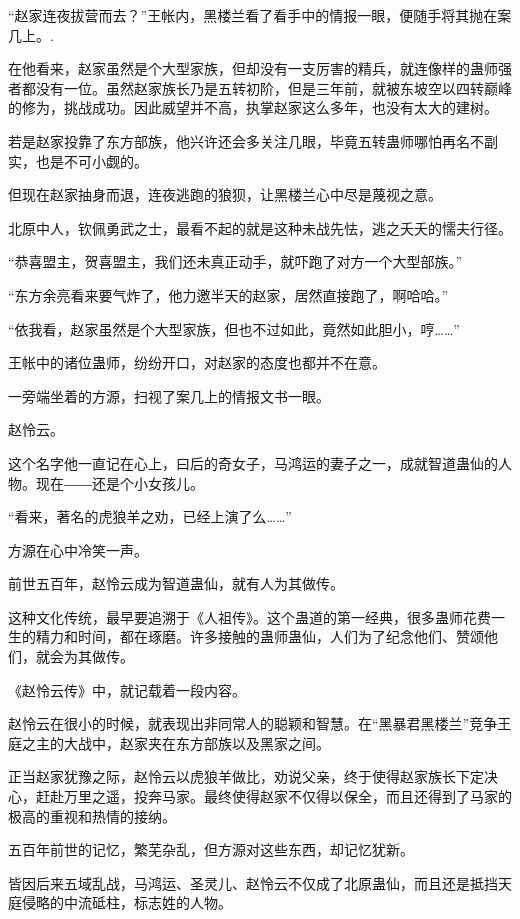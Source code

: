 
\begin{this_body}

“赵家连夜拔营而去？”王帐内，黑楼兰看了看手中的情报一眼，便随手将其抛在案几上。.

在他看来，赵家虽然是个大型家族，但却没有一支厉害的精兵，就连像样的蛊师强者都没有一位。虽然赵家族长乃是五转初阶，但是三年前，就被东坡空以四转巅峰的修为，挑战成功。因此威望并不高，执掌赵家这么多年，也没有太大的建树。

若是赵家投靠了东方部族，他兴许还会多关注几眼，毕竟五转蛊师哪怕再名不副实，也是不可小觑的。

但现在赵家抽身而退，连夜逃跑的狼狈，让黑楼兰心中尽是蔑视之意。

北原中人，钦佩勇武之士，最看不起的就是这种未战先怯，逃之夭夭的懦夫行径。

“恭喜盟主，贺喜盟主，我们还未真正动手，就吓跑了对方一个大型部族。”

“东方余亮看来要气炸了，他力邀半天的赵家，居然直接跑了，啊哈哈。”

“依我看，赵家虽然是个大型家族，但也不过如此，竟然如此胆小，哼……”

王帐中的诸位蛊师，纷纷开口，对赵家的态度也都并不在意。

一旁端坐着的方源，扫视了案几上的情报文书一眼。

赵怜云。

这个名字他一直记在心上，曰后的奇女子，马鸿运的妻子之一，成就智道蛊仙的人物。现在――还是个小女孩儿。

“看来，著名的虎狼羊之劝，已经上演了么……”

方源在心中冷笑一声。

前世五百年，赵怜云成为智道蛊仙，就有人为其做传。

这种文化传统，最早要追溯于《人祖传》。这个蛊道的第一经典，很多蛊师花费一生的精力和时间，都在琢磨。许多接触的蛊师蛊仙，人们为了纪念他们、赞颂他们，就会为其做传。

《赵怜云传》中，就记载着一段内容。

赵怜云在很小的时候，就表现出非同常人的聪颖和智慧。在“黑暴君黑楼兰”竞争王庭之主的大战中，赵家夹在东方部族以及黑家之间。

正当赵家犹豫之际，赵怜云以虎狼羊做比，劝说父亲，终于使得赵家族长下定决心，赶赴万里之遥，投奔马家。最终使得赵家不仅得以保全，而且还得到了马家的极高的重视和热情的接纳。

五百年前世的记忆，繁芜杂乱，但方源对这些东西，却记忆犹新。

皆因后来五域乱战，马鸿运、圣灵儿、赵怜云不仅成了北原蛊仙，而且还是抵挡天庭侵略的中流砥柱，标志姓的人物。


\end{this_body}
